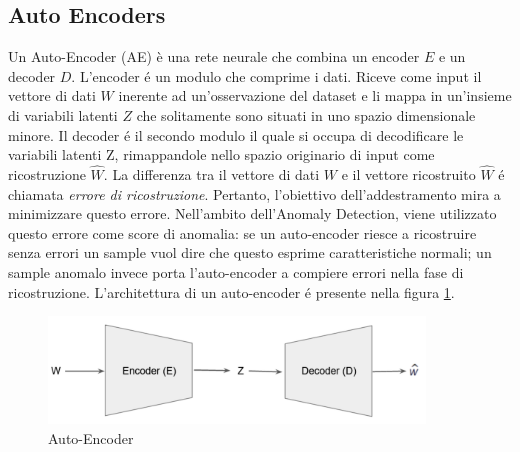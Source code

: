 \subsection{Auto Encoders}
Un Auto-Encoder (AE) è una rete neurale che combina un encoder $E$ e un decoder $D$. L'encoder é un modulo che comprime i dati. Riceve come input il vettore di dati $W$ inerente ad un'osservazione del dataset e li mappa in un'insieme di variabili latenti $Z$ che solitamente sono situati in uno spazio dimensionale minore. Il decoder é il secondo modulo il quale si occupa di decodificare le variabili latenti Z, rimappandole nello spazio originario di input come ricostruzione $\widehat{W}$. La differenza tra il vettore di dati $W$ e il vettore ricostruito $\widehat{W}$ é chiamata \textit{errore di ricostruzione}. Pertanto, l'obiettivo dell'addestramento mira a minimizzare questo errore. Nell'ambito dell'Anomaly Detection, viene utilizzato questo errore come score di anomalia: se un auto-encoder riesce a ricostruire senza errori un sample vuol dire che questo esprime caratteristiche normali; un sample anomalo invece porta l'auto-encoder a compiere errori nella fase di ricostruzione. L'architettura di un auto-encoder é presente nella figura \ref{ae}.
\begin{figure}[t]
	\centering
	\includegraphics[width=10cm, scale=1]{images/ae}
	\caption{Auto-Encoder}
	\label{ae}
\end{figure}

